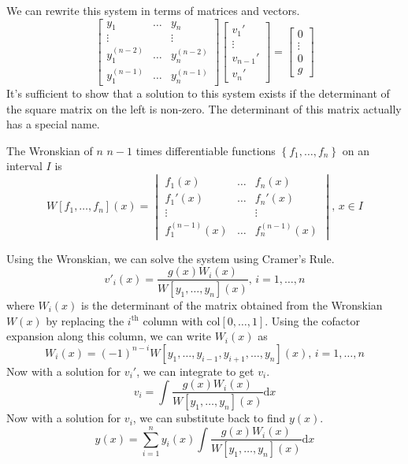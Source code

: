 \noindent
We can rewrite this system in terms of matrices and vectors.
\begin{equation*}
	\begin{bmatrix}
		y_1 & \ldots & y_n \\
		\vdots & & \vdots\\
		y_1^{(n-2)} & \ldots & y_n^{(n-2)} \\
		y_1^{(n-1)} & \ldots & y_n^{(n-1)}
	\end{bmatrix} \begin{bmatrix}
		v_1' \\
		\vdots \\
		v_{n-1}' \\
		v_n'
	\end{bmatrix} = \begin{bmatrix}
		0 \\
		\vdots \\
		0 \\
		g
	\end{bmatrix}
\end{equation*}
It's sufficient to show that a solution to this system exists if the determinant of the square matrix on the left is non-zero. The determinant of this matrix actually has a special name.

\begin{definition}
	The Wronskian of $n$ $n-1$ times differentiable functions $\left\{f_1, \ldots, f_n\right\}$ on an interval $I$ is
	\begin{equation*}
		W[f_1, \ldots, f_n](x) = \begin{vmatrix}
			f_1(x) & \ldots & f_n(x) \\
			f_1'(x) & \ldots & f_n'(x) \\
			\vdots &        & \vdots \\
			f_1^{(n-1)}(x) & \ldots & f_n^{(n-1)}(x)
		\end{vmatrix} \text{, } x \in I
	\end{equation*}
\end{definition} 

\noindent
Using the Wronskian, we can solve the system using Cramer's Rule.
\begin{equation*}
	v'_i(x) = \frac{g(x)W_i(x)}{W[y_1, \ldots, y_n](x)} \text{, } i = 1, \ldots, n
\end{equation*}
where $W_i(x)$ is the determinant of the matrix obtained from the Wronskian $W(x)$ by replacing the $i^{\text{th}}$ column with $\text{col}[0, \ldots, 1]$. Using the cofactor expansion along this column, we can write $W_i(x)$ as
\begin{equation*}
	W_i(x) = (-1)^{n-i}W[y_1, \ldots, y_{i-1}, y_{i+1}, \ldots, y_n](x) \text{, } i = 1, \ldots, n
\end{equation*}
Now with a solution for $v_i'$, we can integrate to get $v_i$.
\begin{equation*}
	v_i = \int{\frac{g(x)W_i(x)}{W[y_1, \ldots, y_n](x)} \mathrm{d}x}
\end{equation*}
Now with a solution for $v_i$, we can substitute back to find $y(x)$.
\begin{equation*}
	y(x) = \sum_{i=1}^{n}{y_i(x)\int{\frac{g(x)W_i(x)}{W[y_1, \ldots, y_n](x)} \mathrm{d}x}}
\end{equation*}

